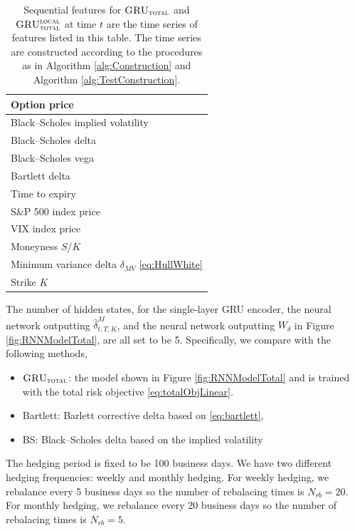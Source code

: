 \documentclass[letterpaper,12pt,titlepage,oneside,final]{book}
\numberwithin{equation}{section}
\theoremstyle{definition}
\newcommand{\modelT}{\textsc{GRU}_{\textsc{total}}}
\newcommand{\modelL}{\textsc{GRU}_{\textsc{total}}^{\textsc{local}}}
\begin{document}
\begin{table}[htp!]
	\centering
	\begin{tabular}{|l|}
		\hline
		Option  price\\ \hline
		Black–Scholes implied volatility\\
		\hline
		Black–Scholes delta\\
		\hline
		Black–Scholes vega \\
		\hline
		Bartlett delta \\
		\hline
		Time to expiry \\\hline
		S\&P 500 index price\\\hline
		VIX index price\\\hline
		Moneyness $S/K$\\\hline
		Minimum variance delta $\delta_{MV}$  \eqref{eq:HullWhite}\\\hline
		Strike $K$ \\   \hline
	\end{tabular}
	\caption{Sequential features for $\modelT$ and $\modelL$ at time $t$ are the  time series of features listed in this table. The time series are constructed according to the procedures as in Algorithm \ref{alg:Construction} and Algorithm \ref{alg:TestConstruction}.}
\end{table}

The number of hidden states, for the single-layer GRU encoder, the neural network outputting $\widehat{\delta}^M_{t,T,K}$, and the neural network outputting $W_{\delta}$  in Figure \ref{fig:RNNModelTotal}, are all set to be 5.  Specifically, we compare with the following methods,
\begin{itemize}
	\item $\modelT$: the model shown in Figure \ref{fig:RNNModelTotal} and is trained with the total risk objective \eqref{eq:totalObjLinear}.
	\item Bartlett: Barlett corrective  delta based on \eqref{eq:bartlett},
	\item BS: Black–Scholes delta based on the implied volatility 
\end{itemize}
The hedging period is fixed to be 100 business days. We have two different hedging frequencies: weekly and monthly hedging. For weekly hedging, we rebalance every 5 business days so the number of rebalacing times is $N_{rb}=20$. For monthly hedging, we rebalance every 20 business days so the number of rebalacing times is $N_{rb}=5$.
\end{document}
